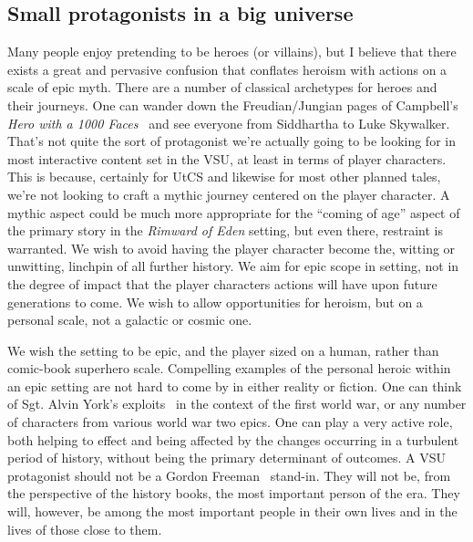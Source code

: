 \subsection{Small protagonists in a big universe}
Many people enjoy pretending to be heroes (or villains), but I believe
that there exists a great and pervasive confusion that conflates
heroism with actions on a scale of epic myth. There are a number of
classical archetypes for heroes and their journeys. One can wander
down the Freudian/Jungian pages of Campbell's {\em Hero with a 1000
Faces}~\cite{herowith1000faces} and see everyone from Siddhartha to
Luke Skywalker.  That's not quite the sort of protagonist we're
actually going to be looking for in most interactive content set in
the VSU, at least in terms of player characters. This is because,
certainly for UtCS and likewise for most other planned tales, we're
not looking to craft a mythic journey centered on the player
character. A mythic aspect could be much more appropriate for the ``coming of age'' aspect of the primary story in the {\it
Rimward of Eden} setting, but even there, restraint is warranted. We
wish to avoid having the player character become the, witting or
unwitting, linchpin of all further history. We aim for epic scope in
setting, not in the degree of impact that the player characters
actions will have upon future generations to come. We wish to allow
opportunities for heroism, but on a personal scale, not a galactic or
cosmic one.

We wish the setting to be epic, and the player sized on a human,
rather than comic-book superhero scale. Compelling examples of the
personal heroic within an epic setting are not hard to come by in
either reality or fiction. One can think of Sgt. Alvin York's
exploits~\cite{SergeantYork} in the context of the first world war, or
any number of characters from various world war two epics. One can
play a very active role, both helping to effect and being affected by
the changes occurring in a turbulent period of history, without being
the primary determinant of outcomes. A VSU protagonist should not be a
Gordon Freeman~\cite{Half-Life-GordonFreeman} stand-in. They will not
be, from the perspective of the history books, the most important
person of the era. They will, however, be among the most important
people in their own lives and in the lives of those close to them.

